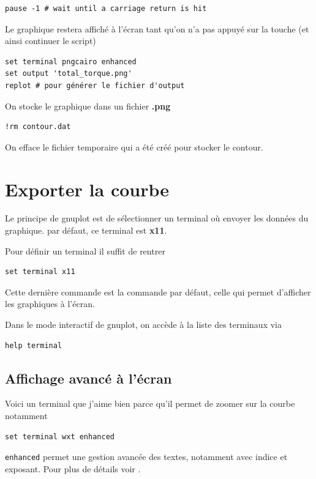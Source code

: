 \documentclass[a4paper,twoside]{article}
\begin{document}
\begin{verbatim}
pause -1 # wait until a carriage return is hit
\end{verbatim}
Le graphique restera affiché à l'écran tant qu'on n'a pas appuyé sur la touche  (et ainsi continuer le script)

\begin{verbatim}
set terminal pngcairo enhanced
set output 'total_torque.png'
replot # pour générer le fichier d'output
\end{verbatim}
On stocke le graphique dans un fichier \textbf{.png}

\begin{verbatim}
!rm contour.dat
\end{verbatim}
On efface le fichier temporaire qui a été créé pour stocker le contour.

\section{Exporter la courbe}\label{sec:terminal}
Le principe de gnuplot est de sélectionner un terminal où envoyer les données du graphique. par défaut, ce terminal est \textbf{x11}. 

Pour définir un terminal il suffit de rentrer
\begin{verbatim}
set terminal x11
\end{verbatim}
Cette dernière commande est la commande par défaut, celle qui permet d'afficher les graphiques à l'écran.

Dans le mode interactif de gnuplot, on accède à la liste des terminaux via
\begin{verbatim}
help terminal
\end{verbatim}


\subsection{Affichage avancé à l'écran}
Voici un terminal que j'aime bien parce qu'il permet de zoomer sur la courbe notamment

\begin{verbatim}
set terminal wxt enhanced
\end{verbatim}

\begin{remarque}
\texttt{enhanced} permet une gestion avancée des textes, notamment avec indice et exposant. Pour plus de détails voir .
\end{remarque}
\end{document}
